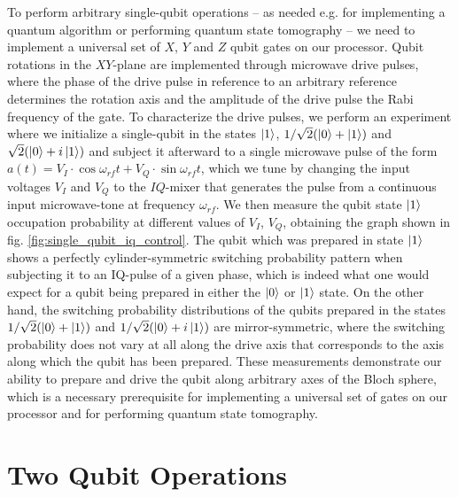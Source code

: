 To perform arbitrary single-qubit operations -- as needed e.g. for implementing a quantum algorithm or performing quantum state tomography -- we need to implement a universal set of $X$, $Y$ and $Z$ qubit gates on our processor. Qubit rotations in the $XY$-plane are implemented through microwave drive pulses, where the phase of the drive pulse in reference to an arbitrary reference determines the rotation axis and the amplitude of the drive pulse the Rabi frequency of the gate. To characterize the drive pulses, we perform an experiment where we initialize a single-qubit in the states $\left| 1 \right>$, $1/\sqrt{2}(\left| 0 \right>+\left| 1 \right>)$ and $\sqrt{2}(\left| 0 \right>+i\left| 1 \right>)$ and subject it afterward to a single microwave pulse of the form $a(t) = V_I\cdot\cos{\omega_{rf}t}+V_Q\cdot\sin{\omega_{rf}t}$, which we tune by changing the input voltages $V_I$ and $V_Q$ to the $IQ$-mixer that generates the pulse from a continuous input microwave-tone at frequency $\omega_{rf}$. We then measure the qubit state $\left| 1 \right>$ occupation probability at different values of $V_I$, $V_Q$, obtaining the graph shown in fig. \ref{fig:single_qubit_iq_control}. The qubit which was prepared in state $\left| 1 \right>$ shows a perfectly cylinder-symmetric switching probability pattern when subjecting it to an IQ-pulse of a given phase, which is indeed what one would expect for a qubit being prepared in either the $\left| 0 \right>$ or $\left| 1 \right>$ state. On the other hand, the switching probability distributions of the qubits prepared in the states $1/\sqrt{2}(\left| 0 \right>+\left| 1 \right>)$ and $1/\sqrt{2}(\left| 0 \right>+i\left| 1 \right>)$ are mirror-symmetric, where the switching probability does not vary at all along the drive axis that corresponds to the axis along which the qubit has been prepared. These measurements demonstrate our ability to prepare and drive the qubit along arbitrary axes of the Bloch sphere, which is a necessary prerequisite for implementing a universal set of gates on our processor and for performing quantum state tomography.

\section{Two Qubit Operations}

